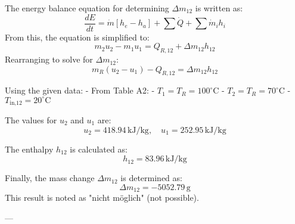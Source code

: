 The energy balance equation for determining \( \Delta m_{12} \) is written as:  
\[
\frac{dE}{dt} = \dot{m} \left[ h_e - h_a \right] + \sum \dot{Q} + \sum \dot{m}_i h_i
\]  
From this, the equation is simplified to:  
\[
m_{2} u_{2} - m_{1} u_{1} = Q_{R,12} + \Delta m_{12} h_{12}
\]  
Rearranging to solve for \( \Delta m_{12} \):  
\[
m_{R} \left( u_{2} - u_{1} \right) - Q_{R,12} = \Delta m_{12} h_{12}
\]  

Using the given data:  
- From Table A2:  
  - \( T_{1} = T_{R} = 100^\circ\text{C} \)  
  - \( T_{2} = T_{R} = 70^\circ\text{C} \)  
- \( T_{\text{in,12}} = 20^\circ\text{C} \)  

The values for \( u_{2} \) and \( u_{1} \) are:  
\[
u_{2} = 418.94 \, \text{kJ/kg}, \quad u_{1} = 252.95 \, \text{kJ/kg}
\]  

The enthalpy \( h_{12} \) is calculated as:  
\[
h_{12} = 83.96 \, \text{kJ/kg}
\]  

Finally, the mass change \( \Delta m_{12} \) is determined as:  
\[
\Delta m_{12} = -5052.79 \, \text{g}
\]  
This result is noted as "nicht möglich" (not possible).  

---